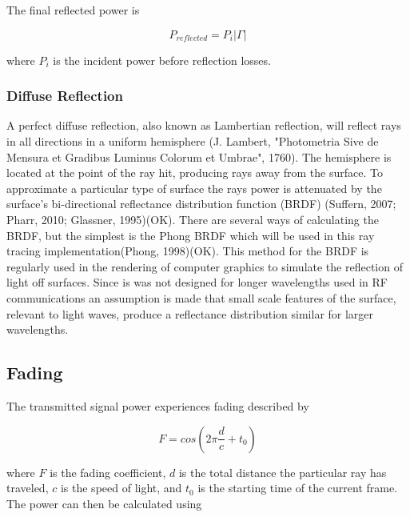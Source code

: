 The final reflected power is

\begin{equation}
	P_{reflected} = P_i|\Gamma|
	\label{eqn:reflected_power}
\end{equation}

where $P_i$ is the incident power before reflection losses.

\subsubsection{Diffuse Reflection}
A perfect diffuse reflection, also known as Lambertian reflection, will reflect rays in all directions in a uniform hemisphere (J. Lambert, "Photometria Sive de Mensura et Gradibus Luminus Colorum et Umbrae", 1760). The hemisphere is located at the point of the ray hit, producing rays away from the surface. To approximate a particular type of surface the rays power is attenuated by the surface's bi-directional reflectance distribution function (BRDF) (Suffern, 2007; Pharr, 2010; Glassner, 1995)(OK). There are several ways of calculating the BRDF, but the simplest is the Phong BRDF which will be used in this ray tracing implementation(Phong, 1998)(OK). This method for the BRDF is regularly used in the rendering of computer graphics to simulate the reflection of light off surfaces. Since is was not designed for longer wavelengths used in RF communications an assumption is made that small scale features of the surface, relevant to light waves,  produce a reflectance distribution similar for larger wavelengths. 


\subsection{Fading}
The transmitted signal power experiences fading described by

\begin{equation}
	F = cos\left(2\pi \frac{d}{c} + t_0\right)
	\label{eqn:fading_coeff}
\end{equation}

where $F$ is the fading coefficient, $d$ is the total distance the particular ray has traveled, $c$ is the speed of light, and $t_0$ is the starting time of the current frame. The power can then be calculated using

